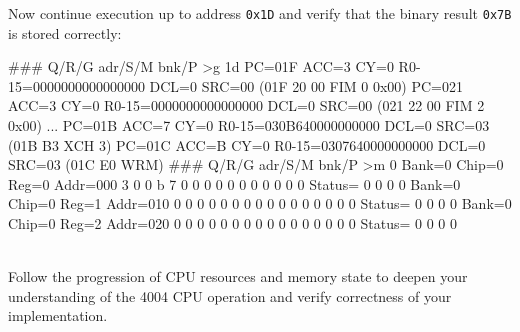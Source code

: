 Now continue execution up to address \texttt{0x1D} and verify that the binary result \texttt{0x7B} is stored correctly:\\

\begin{scriptsize}
\begin{boxedverbatim}
### Q/R/G adr/S/M bnk/P >g 1d
  PC=01F ACC=3 CY=0 R0-15=0000000000000000 DCL=0 SRC=00  (01F 20 00    FIM 0 0x00)
  PC=021 ACC=3 CY=0 R0-15=0000000000000000 DCL=0 SRC=00  (021 22 00    FIM 2 0x00)
...
  PC=01B ACC=7 CY=0 R0-15=030B640000000000 DCL=0 SRC=03  (01B B3       XCH 3)
  PC=01C ACC=B CY=0 R0-15=0307640000000000 DCL=0 SRC=03  (01C E0       WRM)
### Q/R/G adr/S/M bnk/P >m 0
Bank=0 Chip=0 Reg=0 Addr=000  3 0 0 b 7 0 0 0 0 0 0 0 0 0 0 0  Status= 0 0 0 0
Bank=0 Chip=0 Reg=1 Addr=010  0 0 0 0 0 0 0 0 0 0 0 0 0 0 0 0  Status= 0 0 0 0
Bank=0 Chip=0 Reg=2 Addr=020  0 0 0 0 0 0 0 0 0 0 0 0 0 0 0 0  Status= 0 0 0 0
\end{boxedverbatim}
\end{scriptsize}
\\

Follow the progression of CPU resources and memory state to deepen your understanding of the 4004 CPU operation and verify correctness of your implementation.
